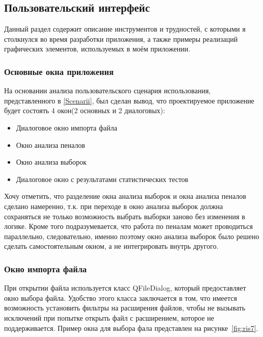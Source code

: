 \subsection{Пользовательский интерфейс}

Данный раздел содержит описание инструментов и трудностей, с которыми я столкнулся во время разработки приложения, а также примеры реализаций графических элементов, используемых в моём приложении.

\subsubsection{Основные окна приложения}

На основании анализа пользовательского сценария использования, представленного в \ref{Scenarii}, был сделан вывод, что проектируемое приложение будет состоять 4 окон(2 основных и 2 диалоговых):

\begin{itemize}
	\item Диалоговое окно импорта файла
	\item Окно анализа пеналов
	\item Окно анализа выборок
	\item Диалоговое окно с результатами статистических тестов 
\end{itemize}

Хочу отметить, что разделение окна анализа выборок и окна анализа пеналов сделано намеренно, т.к. при переходе в окно анализа выборок должна сохраняться не только возможность выбрать выборки заново без изменения в логике. Кроме того подразумевается, что работа по пеналам может проводиться параллельно, следовательно, именно поэтому окно анализа выборок было решено сделать самостоятельным окном, а не интегрировать внутрь другого.

\subsubsection{Окно импорта файла}

При открытии файла используется класс QFileDialog, который предоставляет окно выбора файла. Удобство этого класса заключается в том, что имеется возможность установить фильтры на расширения файлов, чтобы не вызывать исключений при попытке открыть файл с расширением, которое не поддерживается. Пример окна для выбора фала представлен на рисунке~\ref{fig:ris7}.

